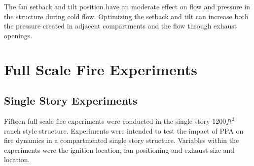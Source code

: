 \documentclass{article}
\begin{document}
The fan setback and tilt position have an moderate effect on flow and pressure in the structure during cold flow. Optimizing the setback and tilt can increase both the pressure created in adjacent compartments and the flow through exhaust openings. 

\section{Full Scale Fire Experiments}

\subsection{Single Story Experiments} \label{SingleStoryExp}

Fifteen full scale fire experiments were conducted in the single story 1200$ft^2$ ranch style structure. Experiments were intended to test the impact of PPA on fire dynamics in a compartmented single story structure. Variables within the experiments were the ignition location, fan positioning and exhaust size and location. 

\mbox{}
\end{document}
